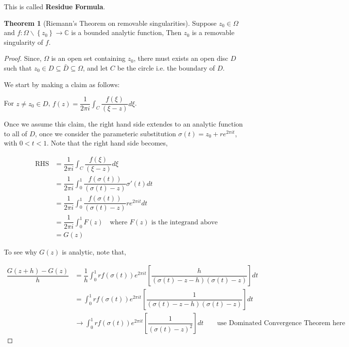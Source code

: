 \documentclass[12pt]{article}
\newcommand{\C}{\mathbb{C}}
\theoremstyle{definition}
\newtheorem{thm}{Theorem}
\newenvironment{theorem}{
\begin{tcolorbox}[colback=green!5!white,colframe=green!75!black, parbox = false]\begin{thm} }{\end{thm}\end{tcolorbox} }
\begin{document}
This is called \textbf{Residue Formula}.


\begin{theorem}[Riemann's Theorem on removable singularities]
    Suppose $z_0 \in \Omega$ and $f : \Omega \backslash \left\{ z_0\right\} \rightarrow \C$ is a bounded analytic function, Then $z_0$ is a removable singularity of $f$.
\end{theorem}

\begin{proof}
    Since, $\Omega$ is an open set containing $z_0$, there must exists an open disc $D$ such that $z_0 \in D \subseteq \bar{D} \subseteq \Omega$, and let $C$ be the circle i.e. the boundary of $D$.

    We start by making a claim as follows:

    For $z \neq z_0 \in D$, $f(z) = \dfrac{1}{2\pi i} \int_C \dfrac{f(\xi)}{(\xi - z)}d\xi$.

    Once we assume this claim, the right hand side extendes to an analytic function to all of $D$, once we consider the parameteric substitution $\sigma(t) = z_0 + r e^{2\pi i t}$, with $0 < t < 1$. Note that the right hand side becomes,

    \begin{align*}
        \text{RHS}
        & = \dfrac{1}{2\pi i} \int_C \dfrac{f(\xi)}{(\xi - z)}d\xi\\
        & = \dfrac{1}{2\pi i} \int_{0}^{1} \dfrac{f(\sigma(t))}{(\sigma(t) - z)}\sigma'(t) dt\\
        & = \dfrac{1}{2\pi i} \int_{0}^{1} \dfrac{f(\sigma(t))}{(\sigma(t) - z)}r e^{2\pi i t} dt \\
        & = \dfrac{1}{2\pi i} \int_{0}^{1} F(z) \quad \text{where } F(z) \text{ is the integrand above}\\
        & = G(z)
    \end{align*}

    To see why $G(z)$ is analytic, note that,

    \begin{align*}
        \dfrac{G(z + h) - G(z)}{h} 
        & = \dfrac{1}{h} \int_{0}^{1} r f(\sigma(t)) e^{2\pi i t} \left[\dfrac{h}{(\sigma(t) - z - h)(\sigma(t) - z)} \right] dt\\
        & = \int_{0}^{1} r f(\sigma(t)) e^{2\pi i t} \left[\dfrac{1}{(\sigma(t) - z - h)(\sigma(t) - z)} \right] dt\\
        & \rightarrow \int_{0}^{1} r f(\sigma(t)) e^{2\pi i t} \left[\dfrac{1}{(\sigma(t) - z)^2} \right] dt \qquad \text{use Dominated Convergence Theorem here}
    \end{align*}


\end{proof}
\end{document}
